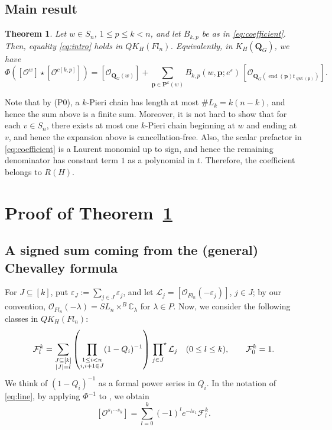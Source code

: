 \documentclass[11pt,a4paper,reqno]{amsart}
\DeclareRobustCommand{\rev}[1]{{\color{revision}#1}}
\numberwithin{equation}{section}
\newtheorem{theorem}{Theorem}[section]
\theoremstyle{definition}
\DeclareMathOperator{\End}{end}
\DeclareMathOperator{\qwt}{qwt}
\newcommand{\C}{\mathbb C}
\newcommand{\QG}{\mathbf Q_G}
\newcommand{\OO}{\mathcal O}
\newcommand{\Sc}[1]{[\OO^{#1}]}
\newcommand{\Si}[1]{[\OO_{\QG(#1)}]}
\newcommand{\Pieri}{\mathbf P}
\newcommand{\pp}{\mathbf p}
\newcommand{\eps}{\varepsilon}
\newcommand{\FF}{\mathcal F}
\newcommand{\ck}{c[k,p]}
\newcommand{\stprod}{\sideset{}{^\star}\prod}
\begin{document}
\subsection{Main result}
\begin{theorem}\label{thm:main}
Let \(w\in S_n\), \(1\le p\le k<n\), and let \(B_{k,p}\) be as in \eqref{eq:coefficient}. Then, equality \eqref{eq:intro} holds in \(QK_{H}(Fl_n)\). Equivalently, in \(K_H(\QG)\), we have 
\begin{equation}\label{eq:semi}
 \Phi(\Sc{w}\star\Sc{\ck})=
 \Si{w}+\sum_{\pp\in\Pieri^k(w)}
 B_{k,p}(w,\pp;e^{\eps})\,\Si{\End(\pp)t_{\qwt(\pp)}} .
\end{equation}
\end{theorem}
\rev{Note that by (P0), a \(k\)-Pieri chain has length at most \(\#L_k=k(n-k)\), and hence the sum above is a finite sum. Moreover, it is not hard to show that for each \(v \in S_n\), there exists at most one \(k\)-Pieri chain beginning at \(w\) and ending at \(v\), and hence the expansion above is cancellation-free. Also, the scalar prefactor in \eqref{eq:coefficient} is a Laurent monomial up to sign, and hence the remaining denominator has constant term \(1\) as a polynomial in \(t\). Therefore, the coefficient belongs to \(R(H)\).}

\section{Proof of Theorem~\ref{thm:main}}\label{sec:proof}
\subsection{A signed sum coming from the (general) Chevalley formula}\label{subsec:genchev}
For \(J\subseteq[k]\), put \(\eps_J:=\sum_{j\in J}\eps_j\), and let \(\mathcal{L}_j=[\OO_{Fl_n}(-\eps_j)]\), \(j \in J\); by our convention, \(\OO_{Fl_n}(-\lambda)=SL_n\times^B\C_\lambda\) for \(\lambda \in P\).
Now, we consider the following classes in \(QK_{H}(Fl_n)\):
\begin{equation}\label{eq:line}
 \FF^k_l=\sum_{\substack{J\subseteq[k]\\ |J|=l}}
 \left(\prod_{\substack{1\le i<n\\i,i+1\in J}}(1-Q_i)^{-1}\right)
 \stprod_{j\in J} \mathcal{L}_j
 \quad(0\le l\le k),\qquad \FF^k_0=1 .
\end{equation}
\rev{We think of \((1-Q_i)^{-1}\) as a formal power series in \(Q_i\). In the notation of \eqref{eq:line}, by applying \(\Phi^{-1}\) to \cite[Proposition~4.7]{MNS1}, we obtain}
\begin{equation}\label{eq:start}
 \Sc{s_1\cdots s_k}=\sum_{l=0}^k(-1)^le^{-l\eps_1}\FF^k_l .
\end{equation}
\end{document}

